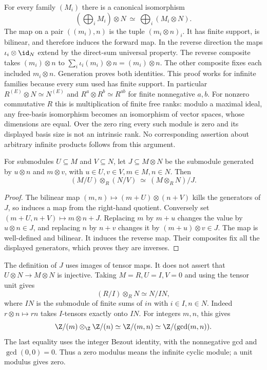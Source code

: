 For every family $(M_i)$ there is a canonical isomorphism
\[
 \left(\bigoplus_iM_i\right)\otimes N
 \ \simeq\ \bigoplus_i(M_i\otimes N).
\]
The map on a pair $((m_i),n)$ is the tuple $(m_i\otimes n)_i$.
It has finite support, is bilinear, and therefore induces the forward
map. In the reverse direction the maps
$\iota_i\otimes\id_N$ extend by the direct-sum universal property.
The reverse composite takes $(m_i)\otimes n$ to
$\sum_i\iota_i(m_i)\otimes n=(m_i)\otimes n$.
The other composite fixes each included $m_i\otimes n$.
Generation proves both identities. This proof works for infinite
families because every sum used has finite support. In particular
$R^{(E)}\otimes N\simeq N^{(E)}$ and
$R^a\otimes R^b\simeq R^{ab}$ for finite nonnegative $a,b$.
For nonzero commutative $R$ this is multiplication of finite free ranks:
modulo a maximal ideal, any free-basis isomorphism becomes an isomorphism
of vector spaces, whose dimensions are equal. Over the zero ring
every such module is zero and its displayed basis size is not an
intrinsic rank. No corresponding assertion about arbitrary infinite
products follows from this argument.

\begin{proposition}\label{prop:tensor-quotient}
For submodules $U\subseteq M$ and $V\subseteq N$, let $J\subseteq M\otimes N$
be the submodule generated by $u\otimes n$ and $m\otimes v$, with
$u\in U,v\in V,m\in M,n\in N$. Then
\[
 (M/U)\otimes_R(N/V)\ \simeq\ (M\otimes_RN)/J.
\]
\end{proposition}
\begin{proof}
The bilinear map $(m,n)\mapsto(m+U)\otimes(n+V)$ kills the generators of
$J$, so induces a map from the right-hand quotient. Conversely set
$(m+U,n+V)\mapsto m\otimes n+J$. Replacing $m$ by $m+u$ changes the
value by $u\otimes n\in J$, and replacing $n$ by $n+v$ changes it by
$(m+u)\otimes v\in J$. The map is well-defined and bilinear.
It induces the reverse map. Their composites fix all the displayed
generators, which proves they are inverses.
\end{proof}
The definition of $J$ uses images of tensor maps. It does not assert that
$U\otimes N\to M\otimes N$ is injective.
Taking $M=R,U=I,V=0$ and using the tensor unit gives
\begin{equation}\label{eq:quotient-tensor}
 (R/I)\otimes_RN\simeq N/IN,
\end{equation}
where $IN$ is the submodule of finite sums of $in$ with $i\in I,n\in N$.
Indeed $r\otimes n\mapsto rn$ takes $I$-tensors exactly onto $IN$.
For integers $m,n$, this gives
\[
 \Z/(m)\otimes_\Z\Z/(n)\simeq\Z/(m,n)
       \simeq\Z/(\gcd(m,n)).
\]
The last equality uses the integer Bezout identity, with the nonnegative
gcd and $\gcd(0,0)=0$. Thus a zero modulus means the infinite cyclic
module; a unit modulus gives zero.

